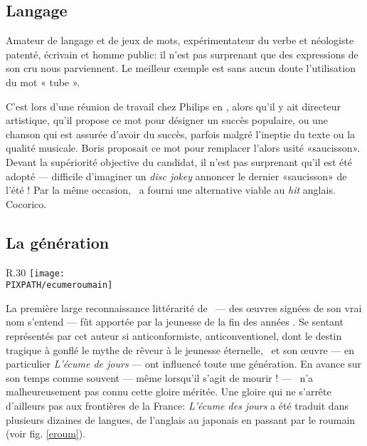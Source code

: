 \subsection{Langage}
Amateur de langage et de jeux de mots, expérimentateur du verbe et néologiste
patenté, écrivain et homme public: il n'est pas surprenant que des expressions
de son cru nous parviennent.
Le meilleur exemple est sans aucun doute l'utilisation du mot « tube ».

C'est lors d'une réunion de travail chez Philips en , alors qu'il y ait
directeur artistique, qu'il propose ce mot pour désigner un succès populaire,
ou une chanson qui est assurée d'avoir du succès, parfois malgré l'ineptie du
texte ou la qualité musicale. Boris proposait ce mot pour remplacer l'alors
usité «saucisson». Devant la supériorité objective du candidat, il n'est pas
surprenant qu'il est été adopté --- difficile d'imaginer un \emph{disc jokey}
annoncer le dernier «saucisson» de l'été ! Par la même occasion, \BV\ a
fourni une alternative viable au \emph{hit} anglais. Cocorico.

\subsection{La génération }

\begin{wrapfigure}{R}{.30\textwidth}
\centering
\texttt{[image: \\PIXPATH/ecumeroumain]}
\caption{Édition roumaine de \emph{L'écume des jours}. Traduction de Sorin Mărculescu}
\label{eroum}
\end{wrapfigure}
La première large reconnaissance littérarité de \BV\ --- des œuvres signées
de son vrai nom s'entend --- fût apportée par la jeunesse de la fin des années .
Se sentant représentés par cet auteur si anticonformiste, anticonventionel, dont
le destin tragique à gonflé le mythe de rêveur à le jeunesse éternelle, \BV\ 
et son œuvre --- en particulier \emph{L'écume de jours} --- ont influencé toute une
génération. En avance sur son temps comme souvent --- même lorsqu'il s'agit de
mourir ! --- \BV\ n'a malheureusement pas connu cette gloire méritée.
Une gloire qui ne s'arrête d'ailleurs pas aux frontières de la France: \emph{L'écume
des jours} a été traduit dans plusieurs dizaines de langues, de l'anglais au japonais en passant
par le roumain (voir fig. \ref{eroum}).

